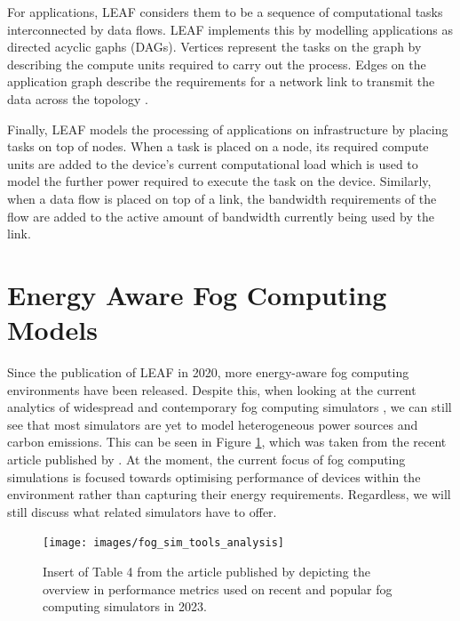 \documentclass{l4proj}
\begin{document}
For applications, LEAF considers them to be a sequence of computational tasks interconnected by data flows.
LEAF implements this by modelling applications as directed acyclic gaphs (DAGs).
Vertices represent the tasks on the graph by describing the compute units required to carry out the process.
Edges on the application graph describe the requirements for a network link to transmit the data across the topology \citep{leaf2021}.

Finally, LEAF models the processing of applications on infrastructure by placing tasks on top of nodes.
When a task is placed on a node, its required compute units are added to the device's current computational load which is used to model the further power required to execute the task on the device.
Similarly, when a data flow is placed on top of a link, the bandwidth requirements of the flow are added to the active amount of bandwidth currently being used by the link.

\section{Energy Aware Fog Computing Models}\label{relWork:sec:models}

Since the publication of LEAF in 2020, more energy-aware fog computing environments have been released.
Despite this, when looking at the current analytics of widespread and contemporary fog computing simulators \citep{fogSimToolAnalysis}, we can still see that most simulators are yet to model heterogeneous power sources and carbon emissions.
This can be seen in Figure \ref{fig:fogtoolsanalysis}, which was taken from the recent article published by \cite{fogSimToolAnalysis}.
At the moment, the current focus of fog computing simulations is focused towards optimising performance of devices within the environment rather than capturing their energy requirements.
Regardless, we will still discuss what related simulators have to offer.
\begin{figure}[h]
    \centering
    \texttt{[image: images/fog\_sim\_tools\_analysis]}
    ~
    \caption{Insert of Table 4 from the article published by \cite{fogSimToolAnalysis} depicting the overview in performance metrics used on recent and popular fog computing simulators in 2023.}
    \label{fig:fogtoolsanalysis}
\end{figure}
\end{document}
